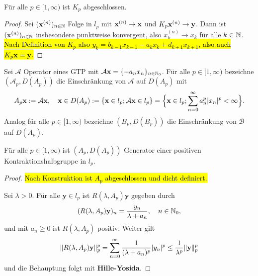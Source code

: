 \begin{lem}\label{Abgeschlossenheit des maximalen Operators K_p}
Für alle $p\in[1,\infty)$ ist $K_p$ abgeschlossen.
\end{lem}

\begin{proof}
Sei $(\textnormal{\textbf{x}}^{(n)})_{n\in\mathbb{N}}$ Folge in $l_p$ mit $\textnormal{\textbf{x}}^{(n)}\to \textnormal{\textbf{x}}$ und $K_p\textnormal{\textbf{x}}^{(n)}\to\textnormal{\index{}\textbf y}$. Dann ist $(\textnormal{\textbf{x}}^{(n)})_{n\in\mathbb{N}}$ insbesondere punktweise konvergent, also $x_k^{(n)}\to x_k$ für alle $k\in \mathbb{N}$. \hl{Nach Definition von $K_p$ also $y_k = b_{k-1}x_{k-1} -a_k x_k + d_{k+1} x_{k+1}$, also auch $K_p\textnormal{\textbf{x}} = \textnormal{\index{}\textbf y}$.}
\end{proof}

\begin{konstr}
Sei $\mathcal A$ Operator eines GTP mit $\mathcal A\textbf{x}=\{-a_nx_n\}_{n\in\mathbb{N}_0}$. Für alle $p\in[1,\infty)$ bezeichne $(\mathcal A_p, D(A_p))$  die Einschränkung von $\mathcal A$ auf $D(A_p)$ mit
\begin{equation*}
A_p\textbf{x} := \mathcal A\textbf{x}, \quad \textbf{x}\in D(A_p):= \{\textnormal{\textbf{x}}\in l_p; \mathcal A\textnormal{\textbf{x}}\in l_p\}=\Big\{\textnormal{\textbf{x}}\in l_p; \sum_{n=0}^\infty a_n^p |x_n|^p < \infty \Big\}.
\end{equation*}
Analog für alle $p\in[1,\infty)$ bezeichne $(B_p, D(B_p))$ die Einschränkung von $\mathcal B$ auf $D(A_p)$.
\end{konstr}

\begin{lem}\label{A_p Generator einer Kontraktionshalbgruppe}
Für alle $p\in[1,\infty)$ ist $(A_p, D(A_p))$ Generator einer positiven Kontraktionshalbgruppe in $l_p$.
\end{lem}

\begin{proof}
\par 
\hl{Nach Konstruktion ist $A_p$ abgeschlossen und dicht definiert.}

\par
Sei  $\lambda>0$. Für alle $\textbf{y}\in l_p$ ist $R(\lambda, A_p)\textbf{y}$ gegeben durch
\begin{equation*}
(R(\lambda, A_p)\textnormal{\index{}\textbf y})_n = \frac{y_n}{\lambda + a_n},\quad n\in\N_0,
\end{equation*}
und mit $a_n\geq0$ ist $R(\lambda, A_p)$ positiv. Weiter gilt
\begin{equation*}
\|R(\lambda, A_p)\textnormal{\index{}\textbf y}\|_p^p = \sum_{n=0}^\infty \frac{1}{(\lambda + a_n)^p}|y_n|^p \leq \frac{1}{\lambda^p}\|\textnormal{\index{}\textbf y}\|_p^p
\end{equation*}
und die Behauptung folgt mit \textbf{Hille-Yosida}.
\end{proof}

